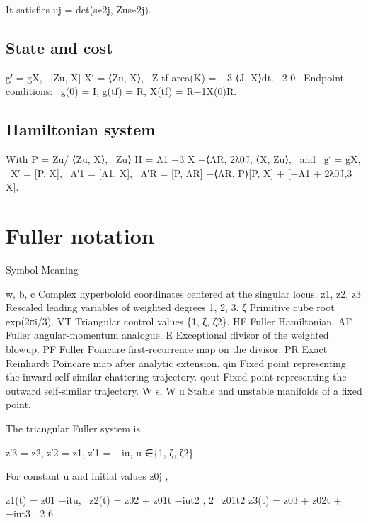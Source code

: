It satisfies uj = det(s∗2j, Zus∗2j).


\subsection{State and cost}

\begin{displaytext}
g′ = gX, \
[Zu, X] X′ = ⟨Zu, X⟩, \
Z tf area(K) = −3 ⟨J, X⟩dt. \
2 0 \
Endpoint conditions: \
g(0) = I, g(tf) = R, X(tf) = R−1X(0)R.
\end{displaytext}

\subsection{Hamiltonian system}

\begin{displaytext}
With P = Zu/ ⟨Zu, X⟩, \
Zu⟩ H = Λ1 −3 X −⟨ΛR, 2λ0J, ⟨X, Zu⟩, \
and \
g′ = gX, \
X′ = [P, X], \
Λ′1 = [Λ1, X], \
Λ′R = [P, ΛR] −⟨ΛR, P⟩[P, X] + [−Λ1 + 2λ0J,3 X].
\end{displaytext}

\section{Fuller notation}

Symbol Meaning


w, b, c Complex hyperboloid coordinates centered at the singular locus. z1, z2, z3 Rescaled leading variables of weighted degrees 1, 2, 3. ζ Primitive cube root exp(2πi/3). VT Triangular control values \{1, ζ, ζ2\}. HF Fuller Hamiltonian. AF Fuller angular-momentum analogue. E Exceptional divisor of the weighted blowup. PF Fuller Poincare first-recurrence map on the divisor. PR Exact Reinhardt Poincare map after analytic extension. qin Fixed point representing the inward self-similar chattering trajectory. qout Fixed point representing the outward self-similar trajectory. W s, W u Stable and unstable manifolds of a fixed point.


The triangular Fuller system is


\begin{displaytext}
z′3 = z2, z′2 = z1, z′1 = −iu, u ∈\{1, ζ, ζ2\}.
\end{displaytext}

For constant u and initial values z0j ,


\begin{displaytext}
z1(t) = z01 −itu, \
z2(t) = z02 + z01t −iut2 , 2 \
z01t2 z3(t) = z03 + z02t + −iut3 . 2 6
\end{displaytext}

